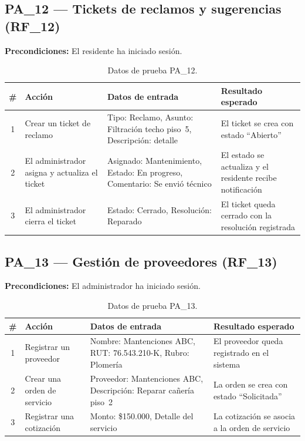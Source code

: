 \subsection{PA\_12 — Tickets de reclamos y sugerencias (RF\_12)}

\textbf{Precondiciones:} El residente ha iniciado sesión.

\begin{table}[H]
\centering
\small
\begin{tabular}{|c|p{}|p{}|p{}|}
\hline
\textbf{\#} & \textbf{Acción} & \textbf{Datos de entrada} & \textbf{Resultado esperado} \\ \hline
1 & Crear un ticket de reclamo & Tipo: Reclamo, Asunto: Filtración techo piso~5, Descripción: detalle & El ticket se crea con estado ``Abierto'' \\ \hline
2 & El administrador asigna y actualiza el ticket & Asignado: Mantenimiento, Estado: En progreso, Comentario: Se envió técnico & El estado se actualiza y el residente recibe notificación \\ \hline
3 & El administrador cierra el ticket & Estado: Cerrado, Resolución: Reparado & El ticket queda cerrado con la resolución registrada \\ \hline
\end{tabular}
\caption{Datos de prueba PA\_12.}
\end{table}

\subsection{PA\_13 — Gestión de proveedores (RF\_13)}

\textbf{Precondiciones:} El administrador ha iniciado sesión.

\begin{table}[H]
\centering
\small
\begin{tabular}{|c|p{}|p{}|p{}|}
\hline
\textbf{\#} & \textbf{Acción} & \textbf{Datos de entrada} & \textbf{Resultado esperado} \\ \hline
1 & Registrar un proveedor & Nombre: Mantenciones ABC, RUT: 76.543.210-K, Rubro: Plomería & El proveedor queda registrado en el sistema \\ \hline
2 & Crear una orden de servicio & Proveedor: Mantenciones ABC, Descripción: Reparar cañería piso~2 & La orden se crea con estado ``Solicitada'' \\ \hline
3 & Registrar una cotización & Monto: \$150.000, Detalle del servicio & La cotización se asocia a la orden de servicio \\ \hline
\end{tabular}
\caption{Datos de prueba PA\_13.}
\end{table}

